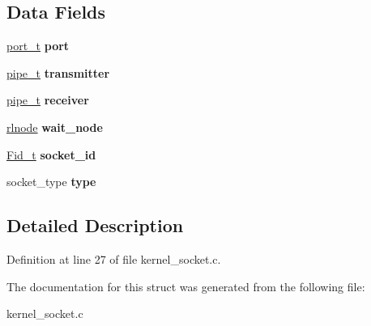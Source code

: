 \subsection*{Data Fields}
\begin{DoxyCompactItemize}
\item 
\hyperlink{group__syscalls_ga13894e5a2ffd5febb7aeb90e87239d61}{port\+\_\+t} {\bfseries port}\hypertarget{structsocket__control__block_a423683847ce85a4d78ea2830e3eb938d}{}\label{structsocket__control__block_a423683847ce85a4d78ea2830e3eb938d}

\item 
\hyperlink{group__syscalls_gad56b5ceaaf7d3ab88b4be7f622314dfb}{pipe\+\_\+t} {\bfseries transmitter}\hypertarget{structsocket__control__block_ac170296c34ccae8e6898c414ebc2bf16}{}\label{structsocket__control__block_ac170296c34ccae8e6898c414ebc2bf16}

\item 
\hyperlink{group__syscalls_gad56b5ceaaf7d3ab88b4be7f622314dfb}{pipe\+\_\+t} {\bfseries receiver}\hypertarget{structsocket__control__block_a391aacf4e12a923f9b284829b60e44b8}{}\label{structsocket__control__block_a391aacf4e12a923f9b284829b60e44b8}

\item 
\hyperlink{group__rlists_ga8f6244877f7ce2322c90525217ea6e7a}{rlnode} {\bfseries wait\+\_\+node}\hypertarget{structsocket__control__block_a9f64ee3e191c8072eddddeb2ed4ed06a}{}\label{structsocket__control__block_a9f64ee3e191c8072eddddeb2ed4ed06a}

\item 
\hyperlink{group__syscalls_ga5097222c5f0da97d92d4712359abc38f}{Fid\+\_\+t} {\bfseries socket\+\_\+id}\hypertarget{structsocket__control__block_aa0ca17a7e9a5f8994e85a4fe8b6818b7}{}\label{structsocket__control__block_aa0ca17a7e9a5f8994e85a4fe8b6818b7}

\item 
socket\+\_\+type {\bfseries type}\hypertarget{structsocket__control__block_aff33160bc35e844f2262cf907a6077de}{}\label{structsocket__control__block_aff33160bc35e844f2262cf907a6077de}

\end{DoxyCompactItemize}


\subsection{Detailed Description}


Definition at line 27 of file kernel\+\_\+socket.\+c.



The documentation for this struct was generated from the following file\+:\begin{DoxyCompactItemize}
\item 
kernel\+\_\+socket.\+c\end{DoxyCompactItemize}
